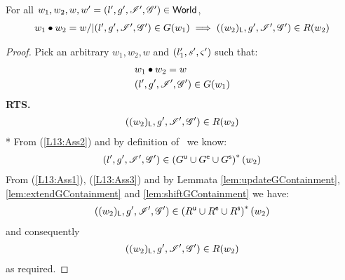 %
\begin{lemma}[] \label{lem:guaranteeContainment}
%
For all $w_1, w_2, w, w' = (l', g', \mathscr{I}', \mathscr{G}') \in \textsf{World}$,
\[
\begin{array}{l}
	w_1 \bullet w_2 = w /| (l', g', \mathscr{I}{}', \mathscr{G}') \in G(w_1) \implies ((w_2)_{\textsf{L}}, g', \mathscr{I}', \mathscr{G}') \in R(w_2)
\end{array}
\]
%
\begin{proof} Pick an arbitrary $w_1, w_2, w$ and $(l'_1, s', \varsigma_{}')$ such that:
%
\begin{align}
	& w_1 \bullet w_2 = w \label{L13:Ass1}\\
	& (l', g', \mathscr{I}', \mathscr{G}{}') \in G(w_1) \label{L13:Ass2}
\end{align}
%
\textbf{RTS.}
%
\begin{align*}
	((w_2)_{\textsf{L}}, g', \mathscr{I}', \mathscr{G}{}') \in R(w_2) 
\end{align*}
*
From (\ref{L13:Ass2}) and by definition of \guarantee\ we know:
%
\begin{align}
	(l', g', \mathscr{I}', \mathscr{G}{}') \in \left(G^{\textsf{u}} \cup G^{\textsf{e}} \cup G^{\textsf{s}} \right)^{*}(w_2) \label{L13:Ass3}
\end{align}
%
From (\ref{L13:Ass1}), (\ref{L13:Ass3}) and by Lemmata \ref{lem:updateGContainment}, \ref{lem:extendGContainment} and \ref{lem:shiftGContainment} we have:
%
\begin{align}
	((w_2)_{\textsf{L}}, g', \mathscr{I}', \mathscr{G}{}') \in \left(R^{\textsf{u}} \cup R^{\textsf{e}} \cup R^{\textsf{s}} \right)^{*}(w_2) \nonumber
\end{align}
%
and consequently 
%
\begin{align}
	((w_2)_{\textsf{L}}, g', \mathscr{I}', \mathscr{G}{}') \in R(w_2) \nonumber
\end{align}
%
as required.
\end{proof}
\end{lemma}
%
%
